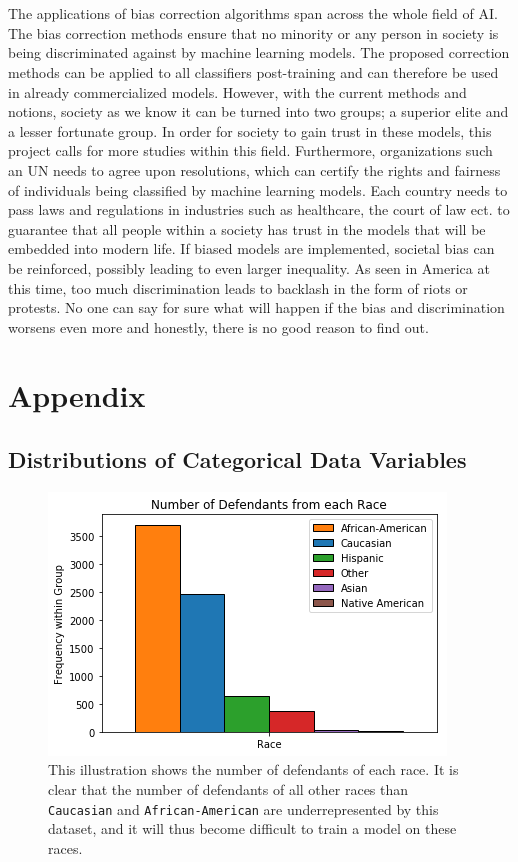 \documentclass[11pt, fleqn, titlepage]{article}
\begin{document}
	\\\\
	The applications of bias correction algorithms span across the whole field of AI. The bias correction methods ensure that no minority or any person in society is being discriminated against by machine learning models. The proposed correction methods can be applied to all classifiers post-training and can therefore be used in already commercialized models. However, with the current methods and notions, society as we know it can be turned into two groups; a superior elite and a lesser fortunate group. In order for society to gain trust in these models, this project calls for more studies within this field. Furthermore, organizations such an UN needs to agree upon resolutions, which can certify the rights and fairness of individuals being classified by machine learning models. Each country needs to pass laws and regulations in industries such as healthcare, the court of law ect. to guarantee that all people within a society has trust in the models that will be embedded into modern life. If biased models are implemented, societal bias can be reinforced, possibly leading to even larger inequality. As seen in America at this time, too much discrimination leads to backlash in the form of riots or protests. No one can say for sure what will happen if the bias and discrimination worsens even more and honestly, there is no good reason to find out.
	
	
	\section{Appendix} \label{appendix}
	
%	

	\subsection{Distributions of Categorical Data Variables}\label{dist_categorical}
	\begin{figure}[H]
		\centering
		\includegraphics[width=0.5\linewidth]{imgs/races}
		\caption{This illustration shows the number of defendants of each race. It is clear that the number of defendants of all other races than \texttt{Caucasian} and \texttt{African-American} are underrepresented by this dataset, and it will thus become difficult to train a model on these races.}
		\label{fig:races}
	\end{figure}
\end{document}
